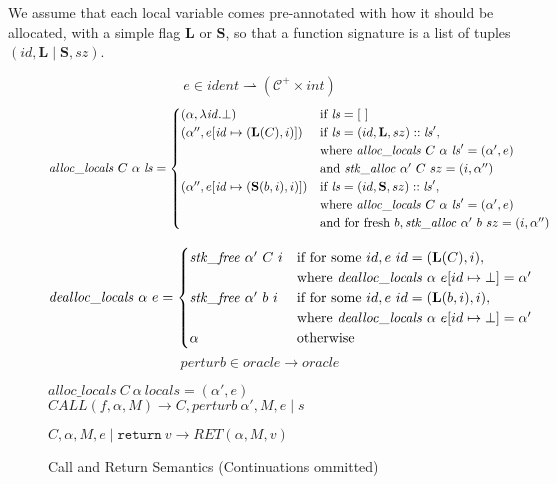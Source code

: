 \documentclass{article}
\begin{document}
We assume that each local variable comes pre-annotated with how it should
be allocated, with a simple flag \(\mathbf{L}\) or \(\mathbf{S}\), so that
a function signature is a list of tuples \((id,\mathbf{L} \mid \mathbf{S},sz)\).

\begin{figure}
  \[e \in \mathit{ident} \rightharpoonup (\mathcal{C}^+ \times \mathit{int})\]
  \[\mathit{alloc\_locals} ~ C ~ \alpha ~ \mathit{ls} =
  \begin{cases}
    (\alpha, \lambda \mathit{id}. \bot) & \textnormal{if } \mathit{ls} = [~]\\
    (\alpha'', e[\mathit{id} \mapsto (\mathbf{L}(C),i)]) &
    \textnormal{if } \mathit{ls} = (id,\mathbf{L},sz)::\mathit{ls}',\\
    & \textnormal{where } \mathit{alloc\_locals} ~ C ~ \alpha ~ \mathit{ls}' =
    (\alpha', e) \\
    & \textnormal{and } \mathit{stk\_alloc} ~ \alpha' ~ C ~ sz = (i, \alpha'') \\
    (\alpha'', e[\mathit{id} \mapsto (\mathbf{S}(b,i),i)]) &
    \textnormal{if } \mathit{ls} = (id,\mathbf{S},sz)::\mathit{ls}',\\
    & \textnormal{where } \mathit{alloc\_locals} ~ C ~ \alpha ~ \mathit{ls}' =
    (\alpha', e) \\
    & \textnormal{and for fresh } b, \mathit{stk\_alloc} ~ \alpha' ~ b ~ sz = (i, \alpha'') \\
  \end{cases}\]

  \[\mathit{dealloc\_locals} ~ \alpha ~ e =
  \begin{cases}
    \mathit{stk\_free} ~ \alpha' ~ C ~ i &
    \textnormal{if for some } id, e ~ id = (\mathbf{L}(C),i),\\
    & \textnormal{where } \mathit{dealloc\_locals} ~ \alpha ~ e[id \mapsto \bot] =
    \alpha' \\
    \mathit{stk\_free} ~ \alpha' ~ b ~ i &
    \textnormal{if for some } id, e ~ id = (\mathbf{L}(b,i),i),\\
    & \textnormal{where } \mathit{dealloc\_locals} ~ \alpha ~ e[id \mapsto \bot] =
    \alpha' \\
    \alpha & \textnormal{otherwise} \\
  \end{cases}\]
  \[\mathit{perturb} \in \mathit{oracle} \rightarrow \mathit{oracle}\]
  
              {\(\mathit{alloc\_locals} ~ C ~ \alpha ~ \mathit{locals} =
                (\alpha',e)\)}
              {\(\mathit{CALL}(f,\alpha,M) \longrightarrow
                C, \mathit{perturb} ~ \alpha', M, e \mid s\)}

           {\(C,\alpha,M,e \mid \mathtt{return} ~ v \longrightarrow
             \mathit{RET}(\alpha,M,v)\)}
           
  \caption{Call and Return Semantics (Continuations ommitted)}
  \label{fig:callret}
\end{figure}
\end{document}
